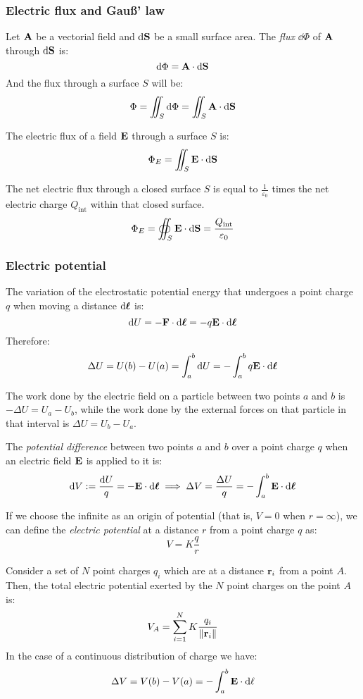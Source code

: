 \documentclass[../../../main.tex]{subfiles}
\begin{document}
\begin{multicols}{2}
  \subsubsection{Electric flux and Gau\ss' law}
  \begin{definition}
    Let $\boldsymbol{\mathrm{A}}$ be a vectorial field and $\dd\boldsymbol{\mathrm{S}}$ be a small surface area. The \emph{flux} $\dd \Phi$ of $\boldsymbol{\mathrm{A}}$ through $\dd \boldsymbol{\mathrm{S}}$ is:
    $$\dd \Phi=\boldsymbol{\mathrm{A}}\cdot\dd\boldsymbol{\mathrm{S}}$$ And the flux through a surface $S$ will be:
    $$\Phi=\iint_S \dd\Phi=\iint_S\boldsymbol{\mathrm{A}}\cdot \dd\boldsymbol{\mathrm{S}}$$
  \end{definition}
  \begin{corollary}
    The electric flux of a field $\boldsymbol{\mathrm{E}}$ through a surface $S$ is:
    $$\Phi_E=\iint_S\boldsymbol{\mathrm{E}}\cdot \dd\boldsymbol{\mathrm{S}}$$
  \end{corollary}
  \begin{law}
    The net electric flux through a closed surface $S$ is equal to $\frac{1}{\varepsilon_0}$ times the net electric charge $Q_\text{int}$ within that closed surface.
    $$\Phi_E=\oiint_S\boldsymbol{\mathrm{E}}\cdot\dd\boldsymbol{\mathrm{S}}=\frac{Q_\text{int}}{\varepsilon_0}$$
  \end{law}
  \subsubsection{Electric potential}
  \begin{prop}
    The variation of the electrostatic potential energy that undergoes a point charge $q$ when moving a distance $\dd\boldsymbol{\mathrm{\ell}}$ is:
    $$\dd U=-\boldsymbol{\mathrm{F}}\cdot \dd\boldsymbol{\mathrm{\ell}}=-q\boldsymbol{\mathrm{E}}\cdot \dd\boldsymbol{\mathrm{\ell}}$$
    Therefore:
    $$\Delta U=U(b)-U(a)=\int_a^b\dd U=-\int_a^bq\boldsymbol{\mathrm{E}}\cdot \dd \boldsymbol{\mathrm{\ell}}$$
  \end{prop}
  \begin{prop}
    The work done by the electric field on a particle between two points $a$ and $b$ is $-\Delta U=U_a-U_b$, while the work done by the external forces on that particle in that interval is $\Delta U=U_b-U_a$.
  \end{prop}
  \begin{definition}
    The \emph{potential difference} between two points $a$ and $b$ over a point charge $q$ when an electric field $\boldsymbol{\mathrm{E}}$ is applied to it is:
    $$\dd V:=\frac{\dd U}{q}=-\boldsymbol{\mathrm{E}}\cdot\dd \boldsymbol{\mathrm{\ell}}\implies\Delta V=\frac{\Delta U}{q}=-\int_a^b\boldsymbol{\mathrm{E}}\cdot\dd \boldsymbol{\mathrm{\ell}}$$
  \end{definition}
  \begin{definition}
    If we choose the infinite as an origin of potential (that is, $V=0$ when $r=\infty$), we can define the \emph{electric potential} at a distance $r$ from a point charge $q$ as: $$V=K\frac{q}{r}$$
  \end{definition}
  \begin{principle}
    Consider a set of $N$ point charges $q_i$ which are at a distance $\boldsymbol{\mathrm{r}}_i$ from a point $A$. Then, the total electric potential exerted by the $N$ point charges on the point $A$ is:
    $$V_A=\sum_{i=1}^NK\frac{q_i}{\|\boldsymbol{\mathrm{r}}_{i}\|}$$
    In the case of a continuous distribution of charge we have:
    $$\Delta V=V(b)-V(a)=-\int_a^b\boldsymbol{\mathrm{E}}\cdot\dd\ell$$
  \end{principle}

\end{multicols}
\end{document}
